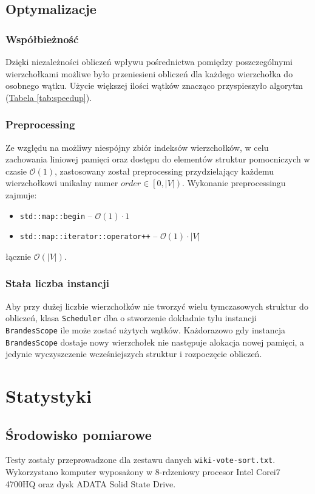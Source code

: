 \documentclass{article}
\begin{document}
    \subsection{Optymalizacje}
      \subsubsection{Współbieżność} Dzięki niezależności obliczeń wpływu pośrednictwa
      pomiędzy poszczególnymi wierzchołkami możliwe było przeniesieni obliczeń dla
      każdego wierzchołka do osobnego wątku. Użycie większej ilości wątków znacząco
      przyspieszyło algorytm (\hyperref[tab:speedup]{Tabela \ref*{tab:speedup}}).

      \subsubsection{Preprocessing} Ze względu na możliwy niespójny zbiór indeksów
      wierzchołków, w celu zachowania liniowej pamięci oraz dostępu do elementów
      struktur pomocniczych w czasie $\mathcal{O}(1)$, zastosowany został
      preprocessing przydzielający każdemu wierzchołkowi unikalny numer
      $order \in \left[0, |V|\right)$. Wykonanie preprocessingu zajmuje:
      \begin{itemize}[noitemsep]
        \item \texttt{std::map::begin} -- $\mathcal{O}(1)\cdot1$
        \item \texttt{std::map::iterator::operator++} -- $\mathcal{O}(1)\cdot|V|$
      \end{itemize}
      łącznie $\mathcal{O}(|V|)$.

      \subsubsection{Stała liczba instancji} Aby przy dużej liczbie wierzchołków nie
      tworzyć wielu tymczasowych struktur do obliczeń, klasa \texttt{Scheduler} dba o
      stworzenie dokładnie tylu instancji \texttt{BrandesScope} ile może zostać
      użytych wątków. Każdorazowo gdy instancja \texttt{BrandesScope} dostaje
      nowy wierzchołek nie następuje alokacja nowej pamięci, a jedynie wyczyszczenie
      wcześniejszych struktur i rozpoczęcie obliczeń.

  \newpage
  \section{Statystyki}
    \subsection{Środowisko pomiarowe}
    Testy zostały przeprowadzone dla zestawu danych \texttt{wiki-vote-sort.txt}.
    Wykorzystano komputer wyposażony w 8-rdzeniowy procesor Intel\textsuperscript{
    \textregistered} Core\texttrademark i7 4700HQ oraz dysk ADATA\textsuperscript{
    \textregistered} Solid State Drive.
\end{document}
